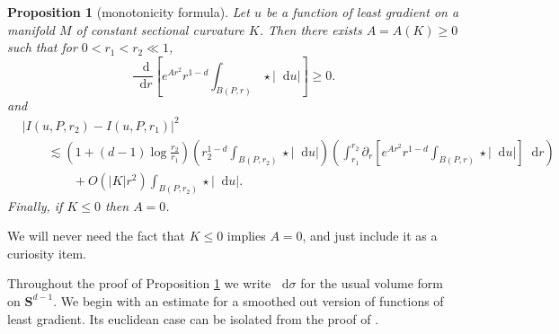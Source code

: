\documentclass[reqno,10pt]{amsart}
\newcommand{\Sph}{\mathbf S}
\newcommand*\dif{\mathop{}\!\mathrm{d}}
\newtheorem{proposition}[theorem]{Proposition}
\theoremstyle{definition}
\numberwithin{equation}{section}
\begin{document}
\begin{proposition}[monotonicity formula]\label{Monotone}
Let $u$ be a function of least gradient on a manifold $M$ of constant sectional curvature $K$.
Then there exists $A = A(K) \geq 0$ such that for $0 < r_1 < r_2 \ll 1$,
\begin{equation}\label{weak monotonicity}
\frac{\dif}{\dif r}\left[e^{Ar^2}r^{1 - d} \int_{B(P, r)} \star |\dif u|\right] \geq 0.
\end{equation}
and
\begin{align*}
&|I(u, P, r_2) - I(u, P, r_1)|^2 \\
&\qquad \lesssim \left(1 + (d - 1) \log \frac{r_2}{r_1}\right) \left(r_2^{1 - d}\int_{B(P, r_2)} \star |\dif u| \right)
\left(\int_{r_1}^{r_2} \partial_r \left[e^{Ar^2} r^{1 - d} \int_{B(P, r)} \star |\dif u|\right] \dif r\right) \\
&\qquad \qquad + O(|K|r^2) \int_{B(P, r_2)} \star |\dif u|.
\end{align*}
Finally, if $K \leq 0$ then $A = 0$.
\end{proposition}

We will never need the fact that $K \leq 0$ implies $A = 0$, and just include it as a curiosity item.

Throughout the proof of Proposition \ref{Monotone} we write $\dif \sigma$ for the usual volume form on $\Sph^{d - 1}$.
We begin with an estimate for a smoothed out version of functions of least gradient.
Its euclidean case can be isolated from the proof of \cite[Lemma 5.8]{Giusti77}.
\end{document}
